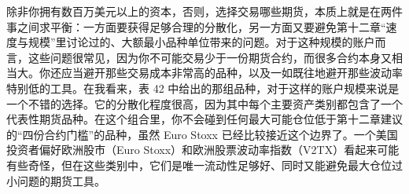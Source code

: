 \begin{chineseblock}除非你拥有数百万美元以上的资本，否则，选择交易哪些期货，本质上就是在两件事之间求平衡：一方面要获得足够合理的分散化，另一方面又要避免第十二章“速度与规模”里讨论过的、大额最小品种单位带来的问题。对于这种规模的账户而言，这些问题很常见，因为你不可能交易少于一份期货合约，而很多合约本身又相当大。你还应当避开那些交易成本非常高的品种，以及一如既往地避开那些波动率特别低的工具。在我看来，表 42 中给出的那组品种，对于这样的账户规模来说是一个不错的选择。它的分散化程度很高，因为其中每个主要资产类别都包含了一个代表性期货品种。在这个组合里，你不会碰到任何最大可能仓位低于第十二章建议的“四份合约门槛”的品种，虽然 Euro Stoxx 已经比较接近这个边界了。一个美国投资者偏好欧洲股市（Euro Stoxx）和欧洲股票波动率指数（V2TX）看起来可能有些奇怪，但在这些类别中，它们是唯一流动性足够好、同时又能避免最大仓位过小问题的期货工具。\end{chineseblock}

\begin{bilingualtableblock} 
\end{bilingualtableblock}

